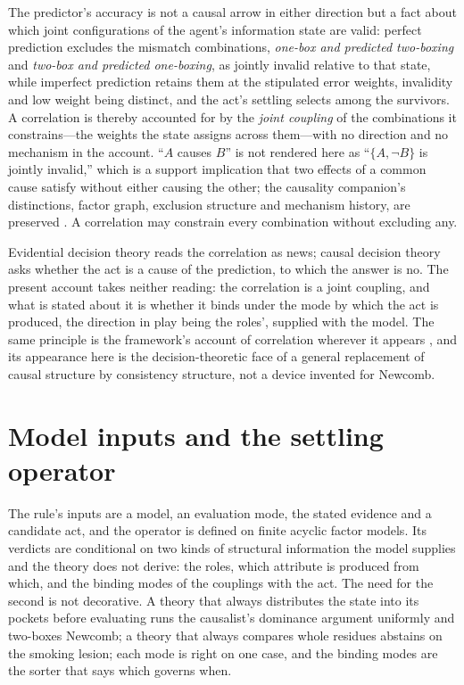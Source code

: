 \begin{principle}\label{prin:joint_invalidity}
The predictor's accuracy is not a causal arrow in either direction but a fact about which joint configurations of the agent's information state are valid: perfect prediction excludes the mismatch combinations, \emph{one-box and predicted two-boxing} and \emph{two-box and predicted one-boxing}, as jointly invalid relative to that state, while imperfect prediction retains them at the stipulated error weights, invalidity and low weight being distinct, and the act's settling selects among the survivors. A correlation is thereby accounted for by the \emph{joint coupling} of the combinations it constrains---the weights the state assigns across them---with no direction and no mechanism in the account. ``$A$ causes $B$'' is not rendered here as ``$\{A, \neg B\}$ is jointly invalid,'' which is a support implication that two effects of a common cause satisfy without either causing the other; the causality companion's distinctions, factor graph, exclusion structure and mechanism history, are preserved \cite{AethusCausality}. A correlation may constrain every combination without excluding any.
\end{principle}
\noindent Evidential decision theory reads the correlation as news; causal decision theory asks whether the act is a cause of the prediction, to which the answer is no. The present account takes neither reading: the correlation is a joint coupling, and what is stated about it is whether it binds under the mode by which the act is produced, the direction in play being the roles', supplied with the model. The same principle is the framework's account of correlation wherever it appears \cite{Aethus}, and its appearance here is the decision-theoretic face of a general replacement of causal structure by consistency structure, not a device invented for Newcomb.

\section{Model inputs and the settling operator}
\label{sec:operator}

\noindent The rule's inputs are a model, an evaluation mode, the stated evidence and a candidate act, and the operator is defined on finite acyclic factor models. Its verdicts are conditional on two kinds of structural information the model supplies and the theory does not derive: the roles, which attribute is produced from which, and the binding modes of the couplings with the act. The need for the second is not decorative. A theory that always distributes the state into its pockets before evaluating runs the causalist's dominance argument uniformly and two-boxes Newcomb; a theory that always compares whole residues abstains on the smoking lesion; each mode is right on one case, and the binding modes are the sorter that says which governs when.

